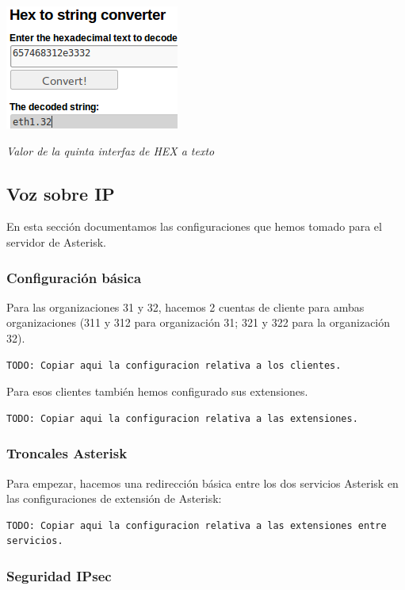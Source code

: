 \documentclass[]{article}
\begin{document}
\begin{center}
	\includegraphics[scale=0.75]{images/snmp/octet.png}
	
	\textit{Valor de la quinta interfaz de HEX a texto}
\end{center}


\subsection{Voz sobre IP}
En esta sección documentamos las configuraciones que hemos tomado para el servidor de Asterisk.

\subsubsection{Configuración básica}
Para las organizaciones 31 y 32, hacemos 2 cuentas de cliente para ambas organizaciones (311 y 312 para organización 31; 321 y 322 para la organización 32).

\begin{lstlisting}
TODO: Copiar aqui la configuracion relativa a los clientes.
\end{lstlisting}

Para esos clientes también hemos configurado sus extensiones.

\begin{lstlisting}
TODO: Copiar aqui la configuracion relativa a las extensiones.
\end{lstlisting}

\subsubsection{Troncales Asterisk}
Para empezar, hacemos una redirección básica entre los dos servicios Asterisk en las configuraciones de extensión de Asterisk:
\begin{lstlisting}
TODO: Copiar aqui la configuracion relativa a las extensiones entre servicios.
\end{lstlisting}


\subsubsection{Seguridad IPsec}
\end{document}
